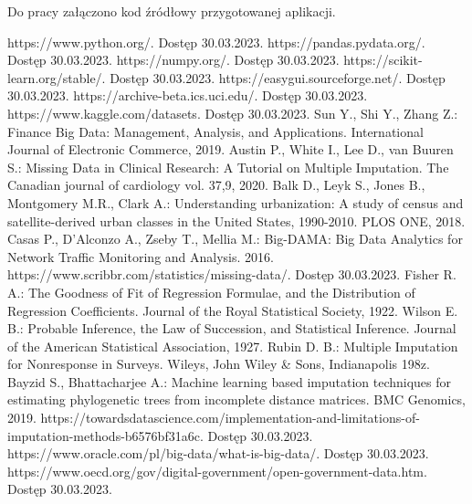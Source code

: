 \documentclass[12pt,twoside]{article}
\begin{document}

Do pracy załączono kod źródłowy przygotowanej aplikacji.

\clearpage



\begin{thebibliography}{4}
     https://www.python.org/. Dostęp 30.03.2023.
     https://pandas.pydata.org/. Dostęp 30.03.2023.
     https://numpy.org/. Dostęp 30.03.2023.
     https://scikit-learn.org/stable/. Dostęp 30.03.2023.
     https://easygui.sourceforge.net/. Dostęp 30.03.2023.
     https://archive-beta.ics.uci.edu/. Dostęp 30.03.2023.
     https://www.kaggle.com/datasets. Dostęp 30.03.2023.
     Sun Y., Shi Y., Zhang Z.: Finance Big Data: Management, Analysis, and Applications. International Journal of Electronic Commerce, 2019.
     Austin P., White I., Lee D., van Buuren S.: Missing Data in Clinical Research: A Tutorial on Multiple Imputation. The Canadian journal of cardiology vol. 37,9, 2020.
     Balk D., Leyk S., Jones B., Montgomery M.R., Clark A.: Understanding urbanization: A study of census and satellite-derived urban classes in the United States, 1990-2010. PLOS ONE, 2018.
     Casas P., D'Alconzo A., Zseby T., Mellia M.: Big-DAMA: Big Data Analytics for Network Traffic Monitoring and Analysis. 2016.
     https://www.scribbr.com/statistics/missing-data/. Dostęp 30.03.2023.
     Fisher R. A.: The Goodness of Fit of Regression Formulae, and the Distribution of Regression Coefficients. Journal of the Royal Statistical Society, 1922.
     Wilson E. B.: Probable Inference, the Law of Succession, and Statistical Inference. Journal of the American Statistical Association, 1927.
     Rubin D. B.: Multiple Imputation for Nonresponse in Surveys. Wileys, John Wiley \& Sons, Indianapolis 198z.
     Bayzid S., Bhattacharjee A.: Machine learning based imputation techniques for estimating phylogenetic trees from incomplete distance matrices. BMC Genomics, 2019.
     https://towardsdatascience.com/implementation-and-limitations-of-imputation-methods-b6576bf31a6c. Dostęp 30.03.2023.
     https://www.oracle.com/pl/big-data/what-is-big-data/. Dostęp 30.03.2023.
     https://www.oecd.org/gov/digital-government/open-government-data.htm. Dostęp 30.03.2023.

\end{thebibliography}
\end{document}
